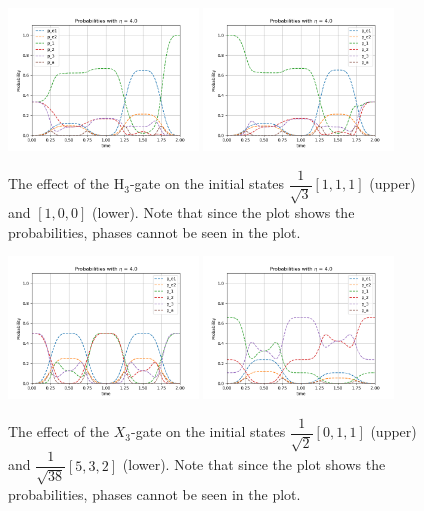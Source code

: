 \documentclass[pra,showpacs,priprent,twocolumn,superscriptaddress]{revtex4-1}
\begin{document}
\begin{figure}[h!]
\centering
\includegraphics[width=0.45\textwidth]{pop_plot_H111.png}
\includegraphics[width=0.45\textwidth]{pop_plot_H100.png}
\caption{The effect of the H$_3$-gate on the initial states $\dfrac{1}{\sqrt{3}}[1,1,1]$ (upper) and $[1,0,0]$ (lower). Note that since the plot shows the probabilities, phases cannot be seen in the plot.}
\label{fig:popH}
\end{figure}


\begin{figure}[h!]
\centering
\includegraphics[width=0.45\textwidth]{pop_plot_X011.png}
\includegraphics[width=0.45\textwidth]{pop_plot_X532.png}
\caption{The effect of the $X_3$-gate on the initial states $\dfrac{1}{\sqrt{2}}[0,1,1]$ (upper) and $\dfrac{1}{\sqrt{38}}[5,3,2]$ (lower). Note that since the plot shows the probabilities, phases cannot be seen in the plot.}
\label{fig:popX}
\end{figure}
\end{document}
